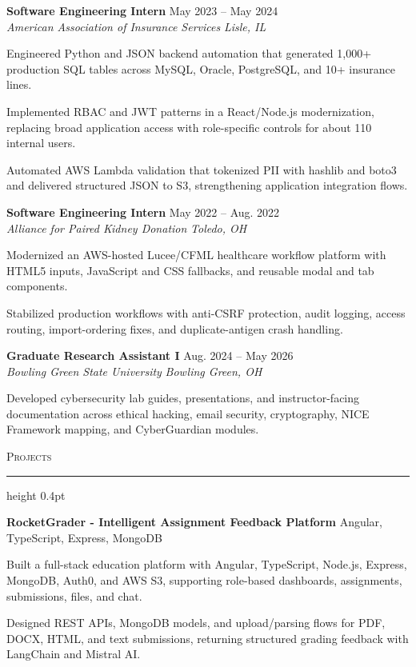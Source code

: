 \documentclass[letterpaper,11pt]{article}
\newcommand{\resumesection}[1]{%
  \par\vspace{2pt}%
  {\large\scshape #1}\par\vspace{2pt}%
  \hrule height 0.4pt\vspace{2pt}%
}
\newcommand{\resumeSubheading}[4]{
  \textbf{#1} \hfill #2\\
  \textit{#3} \hfill \textit{#4}
}
\newcommand{\projectHeading}[2]{
  \textbf{#1} \hfill #2
}
\begin{document}
\resumeSubheading
{Software Engineering Intern}{May 2023 -- May 2024}
{American Association of Insurance Services}{Lisle, IL}
\begin{tightitemize}
  \item Engineered Python and JSON backend automation that generated 1,000+ production SQL tables across MySQL, Oracle, PostgreSQL, and 10+ insurance lines.
  \item Implemented RBAC and JWT patterns in a React/Node.js modernization, replacing broad application access with role-specific controls for about 110 internal users.
  \item Automated AWS Lambda validation that tokenized PII with hashlib and boto3 and delivered structured JSON to S3, strengthening application integration flows.
\end{tightitemize}

\resumeSubheading
{Software Engineering Intern}{May 2022 -- Aug. 2022}
{Alliance for Paired Kidney Donation}{Toledo, OH}
\begin{tightitemize}
  \item Modernized an AWS-hosted Lucee/CFML healthcare workflow platform with HTML5 inputs, JavaScript and CSS fallbacks, and reusable modal and tab components.
  \item Stabilized production workflows with anti-CSRF protection, audit logging, access routing, import-ordering fixes, and duplicate-antigen crash handling.
\end{tightitemize}

\resumeSubheading
{Graduate Research Assistant I}{Aug. 2024 -- May 2026}
{Bowling Green State University}{Bowling Green, OH}
\begin{tightitemize}
  \item Developed cybersecurity lab guides, presentations, and instructor-facing documentation across ethical hacking, email security, cryptography, NICE Framework mapping, and CyberGuardian modules.
\end{tightitemize}

\resumesection{Projects}
\projectHeading{RocketGrader - Intelligent Assignment Feedback Platform}{Angular, TypeScript, Express, MongoDB}
\begin{tightitemize}
  \item Built a full-stack education platform with Angular, TypeScript, Node.js, Express, MongoDB, Auth0, and AWS S3, supporting role-based dashboards, assignments, submissions, files, and chat.
  \item Designed REST APIs, MongoDB models, and upload/parsing flows for PDF, DOCX, HTML, and text submissions, returning structured grading feedback with LangChain and Mistral AI.
\end{tightitemize}
\end{document}
